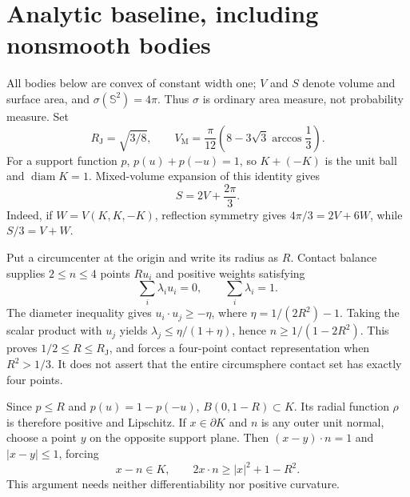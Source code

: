 \documentclass[11pt]{article}
\theoremstyle{remark}\newtheorem{remark}[theorem]{Remark}
\newcommand{\Sph}{\mathbb S^2}
\newcommand{\VM}{V_{\mathrm M}}
\newcommand{\RJ}{R_{\mathrm J}}
\begin{document}
\section{Analytic baseline, including nonsmooth bodies}
All bodies below are convex of constant width one; $V$ and $S$ denote volume and surface area, and $\sigma(\Sph)=4\pi$. Thus $\sigma$ is ordinary area measure, not probability measure. Set
\[
 \RJ=\sqrt{3/8},\qquad
 \VM=\frac{\pi}{12}\left(8-3\sqrt3\arccos\frac13\right).
\]
For a support function $p$, $p(u)+p(-u)=1$, so $K+(-K)$ is the unit ball and $\operatorname{diam}K=1$. Mixed-volume expansion of this identity gives
\begin{equation}\label{hyra:blaschke}
 S=2V+\frac{2\pi}{3}.
\end{equation}
Indeed, if $W=V(K,K,-K)$, reflection symmetry gives $4\pi/3=2V+6W$, while $S/3=V+W$.

Put a circumcenter at the origin and write its radius as $R$. Contact balance supplies $2\leq n\leq4$ points $Ru_i$ and positive weights satisfying
\[
 \sum_i\lambda_i u_i=0,\qquad\sum_i\lambda_i=1.
\]
The diameter inequality gives $u_i\cdot u_j\geq-\eta$, where $\eta=1/(2R^2)-1$. Taking the scalar product with $u_j$ yields $\lambda_j\leq\eta/(1+\eta)$, hence $n\geq1/(1-2R^2)$. This proves $1/2\leq R\leq\RJ$, and forces a four-point contact representation when $R^2>1/3$. It does not assert that the entire circumsphere contact set has exactly four points.

Since $p\leq R$ and $p(u)=1-p(-u)$, $B(0,1-R)\subset K$. Its radial function $\rho$ is therefore positive and Lipschitz. If $x\in\partial K$ and $n$ is any outer unit normal, choose a point $y$ on the opposite support plane. Then $(x-y)\cdot n=1$ and $|x-y|\leq1$, forcing
\begin{equation}\label{hyra:opposite}
 x-n\in K,\qquad 2x\cdot n\geq |x|^2+1-R^2.
\end{equation}
This argument needs neither differentiability nor positive curvature.
\end{document}
